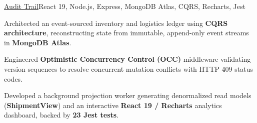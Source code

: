 \begin{cvproject}{\uline{Audit Trail}}{React 19, Node.js, Express, MongoDB Atlas, CQRS, Recharts, Jest}
    \item Architected an event-sourced inventory and logistics ledger using \textbf{CQRS architecture}, reconstructing state from immutable, append-only event streams in \textbf{MongoDB Atlas}.
    \item Engineered \textbf{Optimistic Concurrency Control (OCC)} middleware validating version sequences to resolve concurrent mutation conflicts with HTTP 409 status codes.
    \item Developed a background projection worker generating denormalized read models (\textbf{ShipmentView}) and an interactive \textbf{React 19 / Recharts} analytics dashboard, backed by \textbf{23 Jest tests}.
\end{cvproject}
